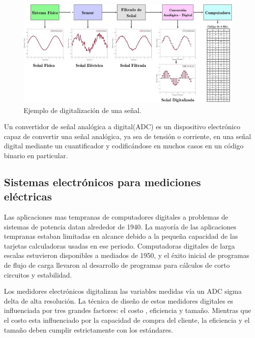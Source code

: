\begin{figure}[h]
	\centering
	\includegraphics[width=140mm,keepaspectratio]{Figures/DigitalDAQ.jpg}
	\caption{Ejemplo de digitalización de una señal.}
	\label{fig:texmaker}
\end{figure}

Un convertidor de señal analógica a digital(ADC) es un dispositivo electrónico capaz de convertir una señal analógica, ya sea de tensión o corriente, en una señal digital mediante un cuantificador y codificándose en muchos casos en un código binario en particular. 

\subsection{Sistemas electrónicos para mediciones eléctricas}

Las aplicaciones mas tempranas de computadores digitales a problemas de sistemas de potencia datan alrededor de 1940. La mayoría de las aplicaciones tempranas estaban limitadas en alcance debido a la pequeña capacidad de las tarjetas calculadoras usadas en ese periodo. Computadoras digitales de larga escalas estuvieron disponibles a mediados de 1950, y el éxito inicial de programas de flujo de carga llevaron al desarrollo de programas para cálculos de corto circuitos y estabilidad.\citep{761852}

Los medidores electrónicos digitalizan las variables medidas vía un ADC sigma delta  de alta resolución. La técnica de diseño de estos medidores digitales es influenciada por tres grandes factores: el costo , eficiencia y tamaño. Mientras que el costo esta influenciado por la capacidad de compra del cliente, la eficiencia y el tamaño deben cumplir estrictamente con los estándares.\cite{articleDM}


